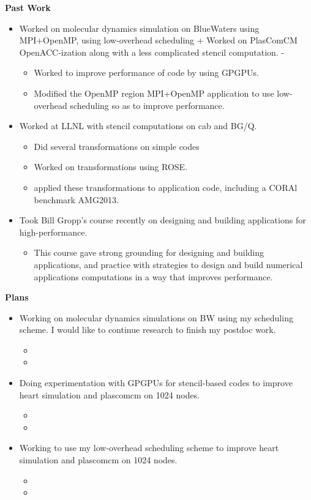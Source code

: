 \begin{frame}[label = atpesc]
\textbf{Past Work} \\  
\begin{itemize} 
\tiny \item \tiny Worked on molecular dynamics simulation on
BlueWaters using MPI+OpenMP, using low-overhead scheduling + Worked on
PlasComCM OpenACC-ization along with a less complicated stencil
computation. - 
\begin{itemize} 
\tiny \item \tiny Worked to improve performance of code by using GPGPUs. 
\item \tiny Modified the OpenMP region MPI+OpenMP application to use
  low-overhead scheduling so as to improve performance. 
\end{itemize} 
\item \tiny Worked at LLNL with stencil computations on cab and BG/Q.  
\begin{itemize}
\tiny \item \tiny Did several transformations on simple codes 
\item \tiny Worked on transformations using ROSE.  
\item \tiny applied these transformations to application code,
  including a CORAl benchmark AMG2013. 
\end{itemize}
\tiny \item \tiny Took Bill Gropp's course recently on designing and
building applications for high-performance. 
\begin{itemize}
  \tiny \item \tiny This course gave strong grounding for designing
  and building applications, and practice with strategies to design
  and build numerical applications computations in a way that improves
  performance.  
\end{itemize}
\end{itemize}
\textbf{Plans}
\begin{itemize} 
\tiny \item \tiny Working on molecular dynamics simulations on BW
using my scheduling scheme. I would like to continue research to
finish my postdoc work. 
\begin{itemize}
\tiny \item \tiny 
\item \tiny 
\end{itemize}
\item \tiny Doing experimentation with GPGPUs for stencil-based
  codes to improve heart simulation and plascomcm on 1024 nodes. 
\begin{itemize} 
\tiny \item \tiny 
\item \tiny 
\end{itemize} 
\item \tiny Working to use my low-overhead
  scheduling scheme to improve heart simulation and plascomcm on 1024
  nodes.     
\begin{itemize} 
\tiny \item \tiny 
\item \tiny 
\end{itemize} 
\end{itemize} 


\end{frame}
